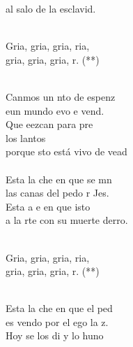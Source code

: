 \begin{cancion}
	al salo de la esclavid. \\\jump\\
	\begin{chorus}%
	Gria, gria, gria, ria,\\
	gria, gria, gria, r. (**)\\
	\end{chorus}%
	\jump\\
	Canmos un nto de espenz\\
	eun mundo evo e vend.  \\
	Que eezcan para pre \\
	los lantos\\
	porque sto está vivo de vead\\
\jump\\
	Esta  la che en que se mn\\
	las canas del pedo r Jes.\\
	Esta a e en que isto\\
	a la rte con su muerte derro. \\\jump\\
	\begin{chorus}%
	Gria, gria, gria, ria,\\
	gria, gria, gria, r. (**)\\
	\end{chorus}%
	\jump\\
	Esta  la che en que el ped\\
	es vendo por el ego  la z.\\
	Hoy se  los di y lo huno\\

\end{cancion}
